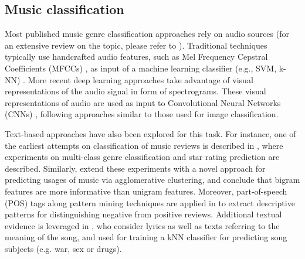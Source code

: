 \subsection{Music classification}
\label{sec:SOA:mir:classfication}


Most published music genre classification approaches rely on audio sources (for an extensive review on the topic, please refer to \cite{sturm2012survey,bogdanov2016cross}).
Traditional techniques typically use handcrafted audio features, such as Mel Frequency Cepstral Coefficients (MFCCs) \citep{logan2000mel}, as input of a machine learning classifier (e.g., SVM, k-NN) \citep{Tzanetakis2002,seyerlehner2010using}.
More recent deep learning approaches take advantage of visual representations of the audio signal in form of spectrograms.
These visual representations of audio are used as input to Convolutional Neural Networks (CNNs) \citep{dieleman2011audio,dieleman2014end,pons2016experimenting,Choi2016,choi2016convolutional}, following approaches similar to those used for image classification.

Text-based approaches have also been explored for this task. For instance, one of the earliest attempts on classification of music reviews is described in \citep{Hu2005}, where experiments on multi-class genre classification and star rating prediction are described. Similarly, \citep{Hu2006} extend these experiments with a novel approach for predicting usages of music via agglomerative clustering, and conclude that bigram features are more informative than unigram features. 
Moreover, part-of-speech (POS) tags along pattern mining techniques are applied in \citep{Downie2006} to extract descriptive patterns for distinguishing negative from positive reviews. Additional textual evidence is leveraged in \citep{Choi2014}, who consider lyrics as well as texts referring to the meaning of the song, and used for training a kNN classifier for predicting song subjects (e.g. war, sex or drugs).

